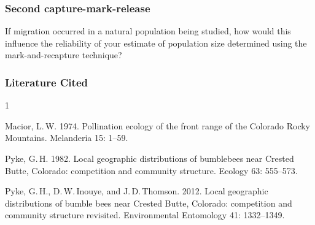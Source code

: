 \documentclass[12pt, hidelinks]{exam}
\begin{document}
\begin{questions}
\begin{tikzpicture}
\end{tikzpicture}


\subsubsection*{Second capture-mark-release}\label{sec:second_mark}



\question[Checkout]
If migration occurred in a natural population being studied, how
would this influence the reliability of your estimate of population size
determined using the mark-and-recapture technique?


\end{questions}


\subsubsection*{Literature Cited}

\begin{hangparas}{\leftmargin}{1}

Macior, L.\,W. 1974. Pollination ecology of the front
range of the Colorado Rocky Mountains. Melanderia 15: 1–59.

Pyke, G.\,H. 1982. Local geographic distributions of bumblebees 
near Crested Butte, Colorado: competition and community structure.
Ecology 63: 555–573.

Pyke, G.\,H., D.\,W.\,Inouye, and J.\,D.\,Thomson. 2012. Local geographic distributions of bumble bees near Crested Butte, Colorado: competition and community structure revisited. Environmental Entomology 41: 1332–1349.

\end{hangparas}
\end{document}
